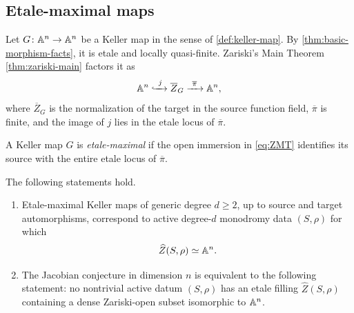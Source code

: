\subsection{Etale-maximal maps}

\begin{setup}\label{setup:keller-normalization}
Let $G\colon\mathbb A^n\to\mathbb A^n$ be a Keller map in the sense of \cref{def:keller-map}.  By \cref{thm:basic-morphism-facts}, it is etale and locally quasi-finite.  Zariski's Main Theorem \cref{thm:zariski-main} factors it as
\begin{equation}\label{eq:ZMT}
  \mathbb A^n\xhookrightarrow{\ j\ }\overline Z_G
  \xrightarrow{\ \overline\pi\ }\mathbb A^n,
\end{equation}
where $\overline Z_G$ is the normalization of the target in the source function field, $\overline\pi$ is finite, and the image of $j$ lies in the etale locus of $\overline\pi$.
\end{setup}

\begin{definition}\label{def:etale-maximal}
A Keller map $G$ is \emph{etale-maximal} if the open immersion in \eqref{eq:ZMT} identifies its source with the entire etale locus of $\overline\pi$.
\end{definition}

\begin{theorem}\label{thm:active-reconstruction}
The following statements hold.

\begin{enumerate}[label=\textup{(\alph*)}]
\item Etale-maximal Keller maps of generic degree $d\geq2$, up to source and target automorphisms, correspond to active degree-$d$ monodromy data $(S,\rho)$ for which
\[
  \widehat Z(S,\rho)\simeq\mathbb A^n.
\]
\item The Jacobian conjecture in dimension $n$ is equivalent to the following statement: no nontrivial active datum $(S,\rho)$ has an etale filling $\widehat Z(S,\rho)$ containing a dense Zariski-open subset isomorphic to $\mathbb A^n$.
\end{enumerate}
\end{theorem}

